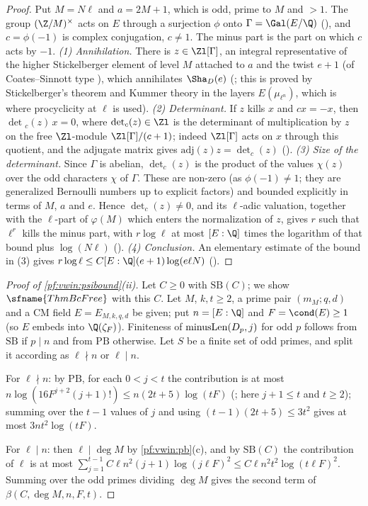 \begin{proof}
Put $M=N\ell$ and $a=2M+1$, which is odd, prime to $M$ and $>1$. The group $(\Z/M)^\times$ acts on $E$ through a surjection $\phi$ onto
$\Gamma=\Gal(E/\Q)$ (), and $c=\phi(-1)$ is complex conjugation, $c\ne1$. The minus part is the part on which
$c$ acts by $-1$.
\emph{(1) Annihilation.} There is $z\in\Zl[\Gamma]$, an integral representative of the higher Stickelberger element of level $M$ attached to
$a$ and the twist $e+1$ (of Coates--Sinnott type \cite{CoatesSinnott1974}), which annihilates $\Sha_D(e)$
(; this is proved by Stickelberger's theorem and Kummer theory in the layers $E(\mu_{\ell^n})$, which is
where procyclicity at $\ell$ is used).
\emph{(2) Determinant.} If $z$ kills $x$ and $cx=-x$, then $\det{}_c(z)\,x=0$, where $\det_c(z)\in\Zl$ is the determinant of multiplication by
$z$ on the free $\Zl$-module $\Zl[\Gamma]/(c+1)$; indeed $\Zl[\Gamma]$ acts on $x$ through this quotient, and the adjugate matrix gives
$\mathrm{adj}(z)z=\det_c(z)$ ().
\emph{(3) Size of the determinant.} Since $\Gamma$ is abelian, $\det_c(z)$ is the product of the values $\chi(z)$ over the odd characters $\chi$ of
$\Gamma$. These are non-zero (as $\phi(-1)\ne1$; they are generalized Bernoulli numbers up to explicit factors) and bounded explicitly in terms of
$M$, $a$ and $e$. Hence $\det_c(z)\ne0$, and its $\ell$-adic valuation, together with the $\ell$-part of $\varphi(M)$ which enters the
normalization of $z$, gives $r$ such that $\ell^r$ kills the minus part, with $r\log\ell$ at most $[E:\Q]$ times the logarithm of that bound plus
$\log(N\ell)$ ().
\emph{(4) Conclusion.} An elementary estimate of the bound in (3) gives $r\log\ell\le C[E:\Q](e+1)\log(e\ell N)$
().\end{proof}

\begin{proof}[Proof of \cref{pf:vwin:psibound}(ii)]
Let $C\ge0$ with $\mathrm{SB}(C)$; we show $\sfname{ThmBcFree}$ with this $C$. Let $M$, $k,t\ge2$, a prime pair $(m_M;q,d)$ and a CM field $E=E_{M,k,q,d}$ be
given; put $n=[E:\Q]$ and $F=\cond(E)\ge1$ (so $E$ embeds into $\Q(\zeta_F)$). Finiteness of $\mathrm{minusLen}(D_p,j)$ for odd $p$ follows from $\mathrm{SB}$ if
$p\mid n$ and from $\mathrm{PB}$ otherwise. Let $S$ be a finite set of odd primes, and split it according as $\ell\nmid n$ or $\ell\mid n$.

For $\ell\nmid n$: by $\mathrm{PB}$, for each $0<j<t$ the contribution is at most $n\log(16F^{j+2}(j+1)!)\le n(2t+5)\log(tF)$
(; here $j+1\le t$ and $t\ge2$); summing over the $t-1$ values of $j$ and using
$(t-1)(2t+5)\le3t^2$ gives at most $3nt^2\log(tF)$.

For $\ell\mid n$: then $\ell\mid\deg M$ by \cref{pf:vwin:pb}(c), and by $\mathrm{SB}(C)$ the contribution of $\ell$ is at most
$\sum_{j=1}^{t-1}C\ell n^2(j+1)\log(j\ell F)^2\le C\ell n^2t^2\log(t\ell F)^2$. Summing over the odd primes dividing $\deg M$ gives the second term of
$\beta(C,\deg M,n,F,t)$.
\end{proof}

